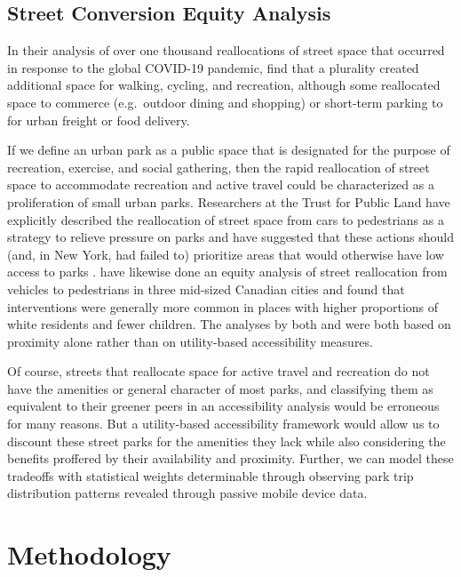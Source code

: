 \documentclass[3p, authoryear, review]{elsarticle} %
\begin{document}
\hypertarget{street-conversion-equity-analysis}{%
\subsection{Street Conversion Equity Analysis}\label{street-conversion-equity-analysis}}

In their analysis of over one thousand reallocations of street space that occurred in response to the global COVID-19 pandemic, \citet{combs2021shifting} find that a plurality created additional space for walking, cycling, and recreation, although some reallocated space to commerce (e.g.~outdoor dining and shopping) or short-term parking to for urban freight or food delivery.

If we define an urban park as a public space that is designated for the purpose of recreation, exercise, and social gathering, then the rapid reallocation of street space to accommodate recreation and active travel could be characterized as a proliferation of small urban parks. Researchers at the Trust for Public Land have explicitly described the reallocation of street space from cars to pedestrians as a strategy to relieve pressure on parks \citep{hussain_parks_2020} and have suggested that these actions should (and, in New York, had failed to) prioritize areas that would otherwise have low access to parks \citep{compton_parks_2020}. \citet{fischer_covid-19_2021} have likewise done an equity analysis of street reallocation from vehicles to pedestrians in three mid-sized Canadian cities and found that interventions were generally more common in places with higher proportions of white residents and fewer children. The analyses by both \citet{compton_parks_2020} and \citet{fischer_covid-19_2021} were both based on proximity alone rather than on utility-based accessibility measures.

Of course, streets that reallocate space for active travel and recreation do not have the amenities or general character of most parks, and classifying them as equivalent to their greener peers in an accessibility analysis would be erroneous for many reasons. But a utility-based accessibility framework would allow us to discount these street parks for the amenities they lack while also considering the benefits proffered by their availability and proximity. Further, we can model these tradeoffs with statistical weights determinable through observing park trip distribution patterns revealed through passive mobile device data.

\hypertarget{methodology}{%
\section{Methodology}\label{methodology}}
\end{document}
